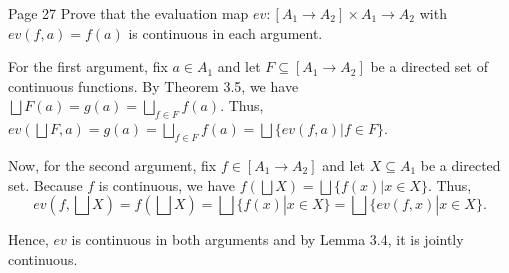\begin{problem}{Page 27}
    Prove that the evaluation map $ev:[A_1 \to A_2] \times A_1 \to A_2$ with $ev(f,a) = f(a)$ is continuous in each argument.
\end{problem}

\begin{solution}
    For the first argument, fix $a \in A_1$ and let $F \subseteq [A_1 \to A_2]$ be a directed set of continuous functions. 
By Theorem 3.5, we have $\bigsqcup F(a) = g(a) = \bigsqcup_{f \in F} f(a)$. Thus,
$ev(\bigsqcup F, a) = g(a) = \bigsqcup_{f \in F} f(a) = \bigsqcup \{ ev(f,a) | f \in F\} $.


Now, for the second argument, fix $f \in [A_1 \to A_2]$ and let $X \subseteq A_1$ be a directed set.
Because $f$ is continuous, we have $f(\bigsqcup X) = \bigsqcup \{f(x) | x \in X\}$. Thus,
$$ ev(f, \bigsqcup X) = f(\bigsqcup X) = \bigsqcup \{f(x) | x \in X\} = \bigsqcup \{ ev(f,x) | x \in X \}. $$

Hence, $ev$ is continuous in both arguments and by Lemma 3.4, it is jointly continuous.
\end{solution}